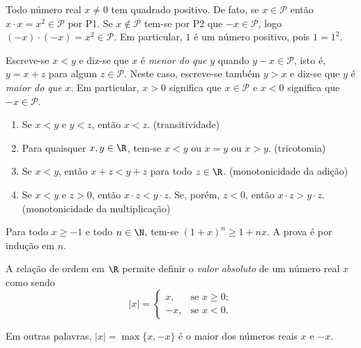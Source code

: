 \documentclass{article}
\begin{document}
\begin{rem}
    Todo número real \(x \neq 0\) tem quadrado positivo. De fato, se \(x \in \mathcal{P}\) então \(x \cdot x = x^2 \in \mathcal{P}\) por P1. Se \(x \notin \mathcal{P}\) tem-se por P2 que \(-x \in \mathcal{P}\), logo \((-x) \cdot (-x) = x^2 \in \mathcal{P}\). Em particular, \(1\) é um número positivo, pois \(1 = 1^2\).
\end{rem}

\begin{defn}
    Escreve-se \(x<y\) e diz-se que \(x\) é \emph{menor do que} \(y\) quando \(y - x \in \mathcal{P}\), isto é, \(y = x+z\) para algum \(z \in \mathcal{P}\). Neste caso, escreve-se também \(y > x\) e diz-se que \(y\) é \emph{maior do que} \(x\). Em particular, \(x>0\) significa que \(x \in \mathcal{P}\) e \(x<0\) significa que \(-x \in \mathcal{P}\).
\end{defn}

\begin{prop} 
    \begin{enumerate}
        \item [\textbf{O1}] Se \(x<y\) e \(y<z\), então \(x<z\). \hfill (transitividade)
        \item [\textbf{O2}] Para quaisquer \(x, y \in \R\), tem-se \(x<y\) ou \(x=y\) ou \(x>y\). \hfill (tricotomia)
        \item [\textbf{O3}] Se \(x<y\), então \(x + z < y + z\) para todo \(z \in \R\). \hfill (monotonicidade da adição)
        \item [\textbf{O4}] Se \(x<y\) e \(z>0\), então \(x \cdot z < y \cdot z\). Se, porém, \(z<0\), então \(x \cdot z > y \cdot z\). \hfill (monotonicidade da multiplicação)
    \end{enumerate}
\end{prop}

\begin{exmp} 
    Para todo \(x \geq -1\) e todo \(n \in \N\), tem-se \((1 + x)^n \geq 1 + nx\). A prova é por indução em \(n\).
\end{exmp}

\begin{defn} 
    A relação de ordem em \(\R\) permite definir o \emph{valor absoluto} de um número real \(x\) como sendo \[|x| = \begin{cases}
        x, & \text{se } x \geq 0; \\
        -x, & \text{se } x < 0.
    \end{cases}\]

    Em outras palavras, \(|x| = \max\{x, -x\}\) é o maior dos números reais \(x\) e \(-x\).
\end{defn}
\end{document}
